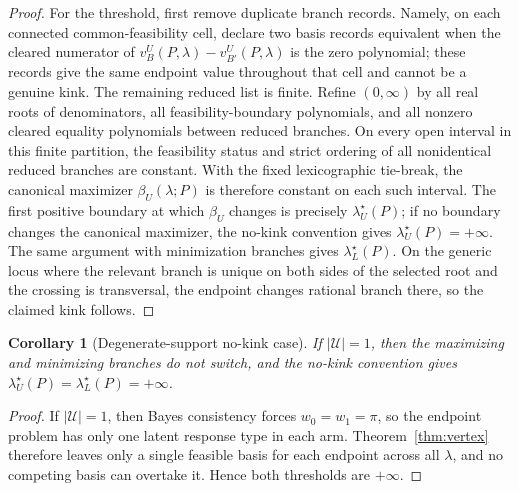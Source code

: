 \documentclass[11pt]{article}
\theoremstyle{definition}
\theoremstyle{plain}
\newtheorem{corollary}{Corollary}
\theoremstyle{remark}
\begin{document}
\begin{proof}
For the threshold, first remove duplicate branch records. Namely, on each connected common-feasibility cell,
declare two basis records equivalent when the cleared numerator of
\(v_B^U(P,\lambda)-v_{B'}^U(P,\lambda)\) is the zero polynomial; these records give the same endpoint value
throughout that cell and cannot be a genuine kink. The remaining reduced list is finite. Refine
\((0,\infty)\) by all real roots of denominators, all feasibility-boundary polynomials, and all nonzero cleared
equality polynomials between reduced branches. On every open interval in this finite partition, the feasibility
status and strict ordering of all nonidentical reduced branches are constant. With the fixed lexicographic
tie-break, the canonical maximizer \(\beta_U(\lambda;P)\) is therefore constant on each such interval. The first
positive boundary at which \(\beta_U\) changes is precisely
\(\lambda_U^\star(P)\); if no boundary changes the canonical maximizer, the no-kink convention gives
\(\lambda_U^\star(P)=+\infty\). The same argument with minimization branches gives
\(\lambda_L^\star(P)\). On the generic locus where the relevant branch is unique on both sides of the selected
root and the crossing is transversal, the endpoint changes rational branch there, so the claimed kink follows.
\end{proof}

\begin{corollary}[Degenerate-support no-kink case]\label{cor:degenerate}
If \(|\mathcal U|=1\), then the maximizing and minimizing branches do not switch, and the no-kink convention gives \(\lambda_U^\star(P)=\lambda_L^\star(P)=+\infty\).
\end{corollary}
\begin{proof}
If \(|\mathcal U|=1\), then Bayes consistency forces \(w_0=w_1=\pi\), so the endpoint problem has only one latent response type in each arm. Theorem~\ref{thm:vertex} therefore leaves only a single feasible basis for each endpoint across all \(\lambda\), and no competing basis can overtake it. Hence both thresholds are \(+\infty\).
\end{proof}
\end{document}
